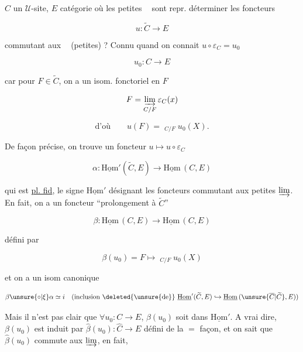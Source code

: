 $C$ un $\mathcal U$-site, $E$ catégorie où les petites $\mathop{\underline{\lim}}$ sont repr. déterminer les foncteurs

\[
u\colon\widetilde C\longrightarrow E
\]

commutant aux $\mathop{\underline{\lim}}$ (petites) ? Connu  quand on connait $u\circ\varepsilon_C=u_0$

\[
u_0\colon C\longrightarrow E
\]


car pour $F\in\widetilde C$, on a un isom. fonctoriel en $F$

\[
F=\varinjlim_{C/F}\varepsilon_C(x)
\]

\[
\text{d'où}\qquad u(F)=\mathop{\underline{\lim}}_{C/F}u_0(X).
\]

De façon précise, on trouve un foncteur $u\longmapsto u\circ\varepsilon_C$

\[
\alpha\colon\underline{\mathrm{Hom}}'(\widetilde C,E)\longrightarrow\underline{\mathrm{Hom}}\,(C,E)
\]

qui est \uline{pl. fid}, le signe $\underline{\mathrm{Hom}}'$ désignant les foncteurs commutant aux petites $\varinjlim$. En fait, on a un foncteur ``prolongement à $\widetilde C$''

\[
\beta\colon\underline{\mathrm{Hom}}\,(C,E)\longrightarrow\underline{\mathrm{Hom}}\,(C,E)
\]

défini par

\[
\beta(u_0)=F\longmapsto\mathop{\underline{\lim}}_{C/F}u_0(X)
\]

et on a un isom canonique

\[
\beta\unsure{\circ|\xi}\alpha\simeq i\quad
(\text{inclusion }\deleted{\unsure{\text{de}}}\ \underline{\mathrm{Hom}}'(\widetilde C,E)\hookrightarrow\underline{\mathrm{Hom}}\,(\unsure{\overline C|\widetilde C},E))
\]

Mais il n'est pas clair que $\forall u_0\colon C\longrightarrow E$, $\beta(u_0)$ soit dans $\underline{\mathrm{Hom}}'$. A vrai dire, $\beta(u_0)$ est induit par $\widehat\beta(u_0)\colon\widehat C\longrightarrow E$ défini de la $=$ façon, et on sait que $\widehat\beta(u_0)$ commute aux $\varinjlim$, en fait,


